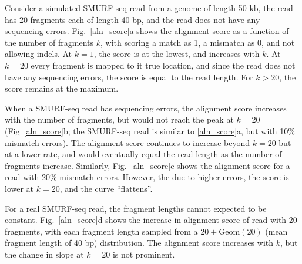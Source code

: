 Consider a simulated SMURF-seq read from a genome of length 50 kb, the
read has 20 fragments each of length 40 bp, and the read does not have
any sequencing errors. Fig.~\ref{aln_score}a shows the alignment score
as a function of the number of fragments $k$, with scoring a match as
1, a mismatch as 0, and not allowing indels. At $k=1$, the score is at
the lowest, and increases with $k$. At $k=20$ every fragment is mapped
to it true location, and since the read does not have any sequencing
errors, the score is equal to the read length. For $k > 20$, the score
remains at the maximum.

When a SMURF-seq read has sequencing errors, the alignment score
increases with the number of fragments, but would not reach the peak at
$k=20$ (Fig~\ref{aln_score}b; the SMURF-seq read is similar to
\ref{aln_score}a, but with 10\% mismatch errors). The alignment score
continues to increase beyond $k=20$ but at a lower rate, and would
eventually equal the read length as the number of fragments increase.
Similarly, Fig.~\ref{aln_score}c shows the alignment score for a read
with 20\% mismatch errors. However, the due to higher errors, the score
is lower at $k=20$, and the curve ``flattens''.

For a real SMURF-seq read, the fragment lengths cannot expected to be
constant. Fig.~\ref{aln_score}d shows the increase in alignment score of
read with 20 fragments, with each fragment length sampled from a $20 +
\text{Geom}(20)$ (mean fragment length of 40 bp) distribution. The
alignment score increases with $k$, but the change in slope at $k=20$ is
not prominent.


